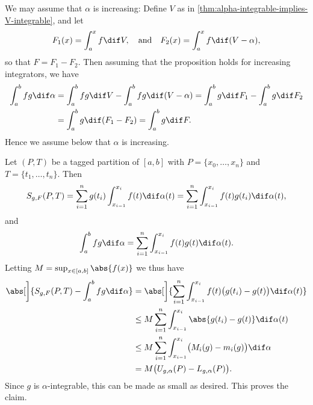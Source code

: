 \documentclass[article, a4paper, 11pt, oneside]{memoir}
\numberwithin{equation}{chapter}
\begin{document}
\begin{proofof}
    We may assume that $\alpha$ is increasing: Define $V$ as in \cref{thm:alpha-integrable-implies-V-integrable}, and let
    \begin{equation*}
        F_1(x)
            = \int_a^x f \dif V,
        \quad \text{and} \quad
        F_2(x)
            = \int_a^x f \dif (V - \alpha),
    \end{equation*}
    so that $F = F_1 - F_2$. Then assuming that the proposition holds for increasing integrators, we have
    \begin{align*}
        \int_a^b fg \dif\alpha
            &= \int_a^b fg \dif V - \int_a^b fg \dif (V-\alpha)
             = \int_a^b g \dif F_1 - \int_a^b g \dif F_2 \\
            &= \int_a^b g \dif (F_1 - F_2)
             = \int_a^b g \dif F.
    \end{align*}
    Hence we assume below that $\alpha$ is increasing.
    
    Let $(P,T)$ be a tagged partition of $[a,b]$ with $P = \{x_0, \ldots, x_n\}$ and $T = \{t_1, \ldots, t_n\}$. Then
    \begin{equation*}
        S_{g,F}(P,T)
            = \sum_{i=1}^n g(t_i) \int_{x_{i-1}}^{x_i} f(t) \dif\alpha(t)
            = \sum_{i=1}^n \int_{x_{i-1}}^{x_i} f(t) g(t_i) \dif\alpha(t),
    \end{equation*}
    and
    \begin{equation*}
        \int_a^b fg \dif\alpha
            = \sum_{i=1}^n \int_{x_{i-1}}^{x_i} f(t) g(t) \dif\alpha(t).
    \end{equation*}
    Letting $M = \sup_{x \in [a,b]} \abs{f(x)}$ we thus have
    \begin{align*}
        \abs[\bigg]{ S_{g,F}(P,T) - \int_a^b fg \dif\alpha }
            &= \abs[\bigg]{ \sum_{i=1}^n \int_{x_{i-1}}^{x_i} f(t) \bigl( g(t_i) - g(t) \bigr) \dif\alpha(t) } \\
            &\leq M \sum_{i=1}^n \int_{x_{i-1}}^{x_i} \abs{ g(t_i) - g(t) } \dif\alpha(t) \\
            &\leq M \sum_{i=1}^n \int_{x_{i-1}}^{x_i} \bigl( M_i(g) - m_i(g) \bigr) \dif\alpha \\
            &= M \bigl( U_{g,\alpha}(P) - L_{g,\alpha}(P) \bigr).
    \end{align*}
    Since $g$ is $\alpha$-integrable, this can be made as small as desired. This proves the claim.
\end{proofof}
\end{document}
